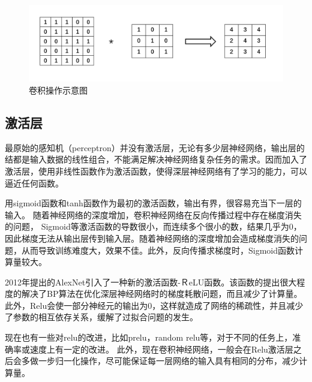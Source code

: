 \begin{figure}[h]
\begin{center}
\includegraphics[width=1\textwidth]{figures/CNN2.png}
\end{center}
\vspace{-5mm}
\caption{卷积操作示意图}
\end{figure}

\subsection{激活层}
最原始的感知机（perceptron）并没有激活层，无论有多少层神经网络，输出层的结都是输入数据的线性组合，不能满足解决神经网络复杂任务的需求。因而加入了激活层，使用非线性函数作为激活函数，使得深层神经网络有了学习的能力，可以逼近任何函数。

用sigmoid函数和tanh函数作为最初的激活函数，输出有界，很容易充当下一层的输入。
随着神经网络的深度增加，卷积神经网络在反向传播过程中存在梯度消失的问题，
Sigmoid等激活函数的导数很小，而连续多个很小的数，结果几乎为0，因此梯度无法从输出层传到输入层。随着神经网络的深度增加会造成梯度消失的问题，从而导致训练难度大，效果不佳。此外，反向传播求梯度时，Sigmoid函数计算量较大。

2012年提出的AlexNet引入了一种新的激活函数-ＲeLU函数。该函数的提出很大程度的解决了BP算法在优化深层神经网络时的梯度耗散问题，而且减少了计算量。此外，Relu会使一部分神经元的输出为0，这样就造成了网络的稀疏性，并且减少了参数的相互依存关系，缓解了过拟合问题的发生。

现在也有一些对relu的改进，比如prelu，random relu等，对于不同的任务上，准确率或速度上有一定的改进。
此外，现在卷积神经网络，一般会在Relu激活层之后会多做一步归一化操作，尽可能保证每一层网络的输入具有相同的分布，减少计算量。

